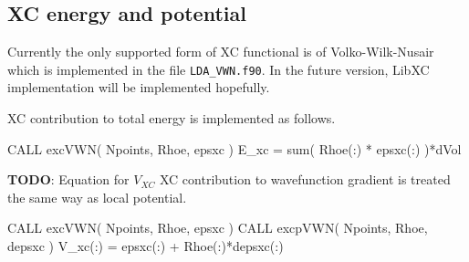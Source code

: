 \subsection{XC energy and potential}

Currently the only supported form of XC functional is of Volko-Wilk-Nusair
which is implemented in the file {\tt LDA\_VWN.f90}.
In the future version, LibXC implementation will be implemented hopefully.

XC contribution to total energy is implemented as follows.
\begin{fortrancode}
CALL excVWN( Npoints, Rhoe, epsxc )
E_xc = sum( Rhoe(:) * epsxc(:) )*dVol
\end{fortrancode}

\textbf{TODO}: Equation for $V_{XC}$
XC contribution to wavefunction gradient is treated the same way as
local potential.
\begin{fortrancode}
CALL excVWN( Npoints, Rhoe, epsxc )
CALL excpVWN( Npoints, Rhoe, depsxc )
V_xc(:) = epsxc(:) + Rhoe(:)*depsxc(:)
\end{fortrancode}

